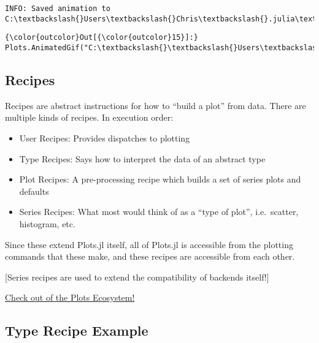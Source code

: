 \documentclass[11pt]{article}
\begin{document}
    \begin{Verbatim}[commandchars=\\\{\}]
INFO: Saved animation to C:\textbackslash{}Users\textbackslash{}Chris\textbackslash{}.julia\textbackslash{}v0.5\textbackslash{}IntroToJulia\textbackslash{}notebooks\textbackslash{}tmp.gif

    \end{Verbatim}

            \begin{Verbatim}[commandchars=\\\{\}]
{\color{outcolor}Out[{\color{outcolor}15}]:} Plots.AnimatedGif("C:\textbackslash{}\textbackslash{}Users\textbackslash{}\textbackslash{}Chris\textbackslash{}\textbackslash{}.julia\textbackslash{}\textbackslash{}v0.5\textbackslash{}\textbackslash{}IntroToJulia\textbackslash{}\textbackslash{}notebooks\textbackslash{}\textbackslash{}tmp.gif")
\end{Verbatim}
        
    \subsection{Recipes}\label{recipes}

Recipes are abstract instructions for how to ``build a plot'' from data.
There are multiple kinds of recipes. In execution order:

\begin{itemize}
\itemsep1pt\parskip0pt
\item
  User Recipes: Provides dispatches to plotting
\item
  Type Recipes: Says how to interpret the data of an abstract type
\item
  Plot Recipes: A pre-processing recipe which builds a set of series
  plots and defaults
\item
  Series Recipes: What most would think of as a ``type of plot'',
  i.e.~scatter, histogram, etc.
\end{itemize}

Since these extend Plots.jl itself, all of Plots.jl is accessible from
the plotting commands that these make, and these recipes are accessible
from each other.

{[}Series recipes are used to extend the compatibility of backends
itself!{]}

\href{https://juliaplots.github.io/ecosystem/}{Check out of the Plots
Ecosystem!}

    \subsection{Type Recipe Example}\label{type-recipe-example}
\end{document}
